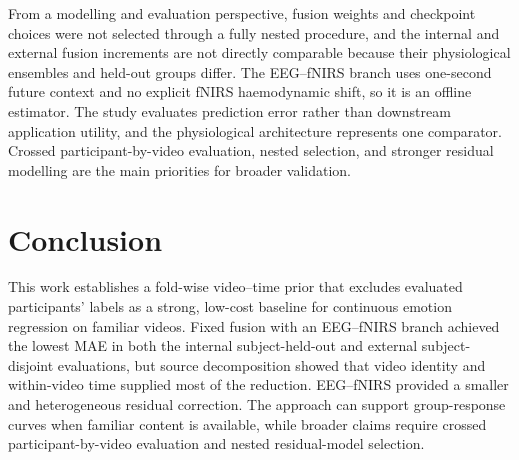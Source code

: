 From a modelling and evaluation perspective, fusion weights and checkpoint
choices were not selected through a fully nested procedure, and the internal
and external fusion increments are not directly comparable because their
physiological ensembles and held-out groups differ. The EEG--fNIRS branch uses
one-second future context and no explicit fNIRS haemodynamic shift, so it is an
offline estimator. The study evaluates prediction error rather than downstream
application utility, and the physiological architecture represents one
comparator.
Crossed participant-by-video evaluation, nested selection, and stronger
residual modelling are the main priorities for broader validation.

\section{Conclusion}
\label{sec:conclusion}

This work establishes a fold-wise video--time prior that excludes evaluated
participants' labels as a strong, low-cost baseline for continuous emotion
regression on familiar videos. Fixed
fusion with an EEG--fNIRS branch achieved the lowest MAE in both the internal
subject-held-out and external subject-disjoint evaluations, but source
decomposition showed that video identity and
within-video time supplied most of the reduction. EEG--fNIRS provided a smaller
and heterogeneous residual correction. The approach can support group-response
curves when familiar content is available, while broader claims require crossed
participant-by-video evaluation and nested residual-model selection.
